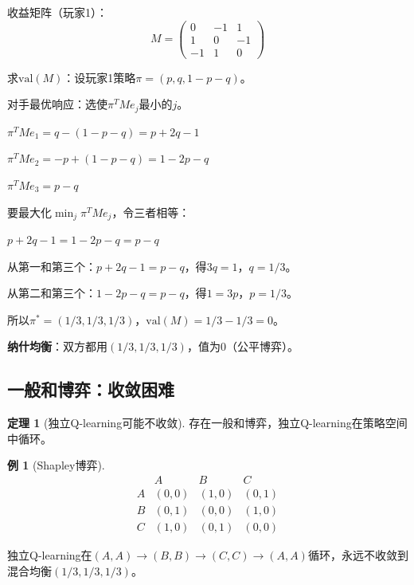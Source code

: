 \documentclass[11pt,a4paper]{article}
\theoremstyle{definition}
\newtheorem{example}{例}[section]
\newtheorem{theorem}{定理}[section]
\begin{document}
\begin{calculation}[石头剪刀布的值]
收益矩阵（玩家1）：
\[
M = \begin{pmatrix} 0 & -1 & 1 \\ 1 & 0 & -1 \\ -1 & 1 & 0 \end{pmatrix}
\]

求$\text{val}(M)$：设玩家1策略$\pi = (p, q, 1-p-q)$。

对手最优响应：选使$\pi^T M e_j$最小的$j$。

$\pi^T M e_1 = q - (1-p-q) = p + 2q - 1$

$\pi^T M e_2 = -p + (1-p-q) = 1 - 2p - q$

$\pi^T M e_3 = p - q$

要最大化$\min_j \pi^T M e_j$，令三者相等：

$p + 2q - 1 = 1 - 2p - q = p - q$

从第一和第三个：$p + 2q - 1 = p - q$，得$3q = 1$，$q = 1/3$。

从第二和第三个：$1 - 2p - q = p - q$，得$1 = 3p$，$p = 1/3$。

所以$\pi^* = (1/3, 1/3, 1/3)$，$\text{val}(M) = 1/3 - 1/3 = 0$。

\textbf{纳什均衡}：双方都用$(1/3, 1/3, 1/3)$，值为0（公平博弈）。
\end{calculation}

\subsection{一般和博弈：收敛困难}

\begin{theorem}[独立Q-learning可能不收敛]
存在一般和博弈，独立Q-learning在策略空间中循环。
\end{theorem}

\begin{example}[Shapley博弈]
\[
\begin{array}{c|ccc}
& A & B & C \\
\hline
A & (0,0) & (1,0) & (0,1) \\
B & (0,1) & (0,0) & (1,0) \\
C & (1,0) & (0,1) & (0,0)
\end{array}
\]

独立Q-learning在$(A,A) \to (B,B) \to (C,C) \to (A,A)$循环，永远不收敛到混合均衡$(1/3, 1/3, 1/3)$。
\end{example}

\end{document}
